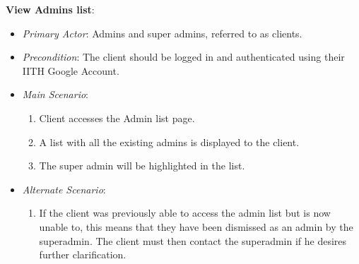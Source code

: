 \documentclass{article}
\begin{document}
\textbf{View Admins list}:
\label{ucviewadminslist}
\begin{itemize}
    \item \textit{Primary Actor}: Admins and super admins, referred to as clients.
    \item \textit{Precondition}: The client should be logged in and authenticated using their IITH Google Account.
    \item \textit{Main Scenario}:
    \begin{enumerate}
        \item Client accesses the Admin list page.
        \item A list with all the existing admins is displayed to the client.
        \item The super admin will be highlighted in the list.
    \end{enumerate}
    \item \textit{Alternate Scenario}:
        \begin{enumerate}
            \item If the client was previously able to access the admin list but is now unable to, this means that they have been dismissed as an admin by the superadmin. The client must then contact the superadmin if he desires further clarification. 
        \end{enumerate}
    
\end{itemize}
\end{document}
